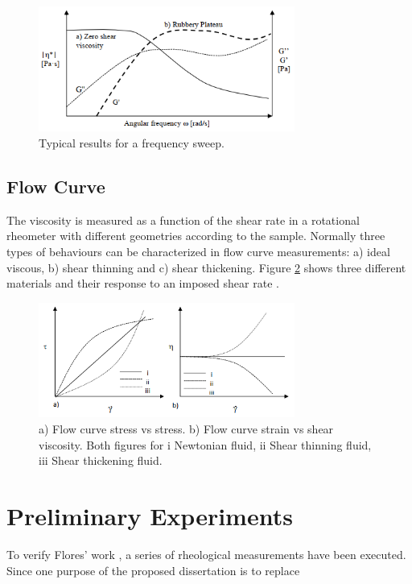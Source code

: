 \begin{figure}[th]
\centering
\includegraphics[width=0.75\textwidth]{./Figures/freqSweep.png}
\decoRule
\caption[Frequency Sweep]{Typical results for a frequency sweep. \cite{Flores2017}}
\label{fig:freqSweep}
\end{figure}

\subsection{Flow Curve}
The viscosity is measured as a function of the shear rate in a rotational rheometer with different geometries according to the sample. Normally three types of behaviours can be characterized in flow curve measurements: a) ideal viscous, b) shear thinning and c) shear thickening. Figure \ref{fig:flowCurve} shows three different materials and their response to an imposed shear rate \cite{Flores2017}.

\begin{figure}[th]
\centering
\includegraphics[width=0.75\textwidth]{./Figures/flowCurve.png}
\decoRule
\caption[Flow Curves]{a) Flow curve stress vs stress. b) Flow curve strain vs shear viscosity. Both figures for i Newtonian fluid, ii Shear thinning fluid, iii Shear thickening fluid. \cite{Flores2017}}
\label{fig:flowCurve}
\end{figure}

\section{Preliminary Experiments}

To verify Flores' work \cite{Flores2017}, a series of rheological measurements have been executed. Since one purpose of the proposed dissertation is to replace






